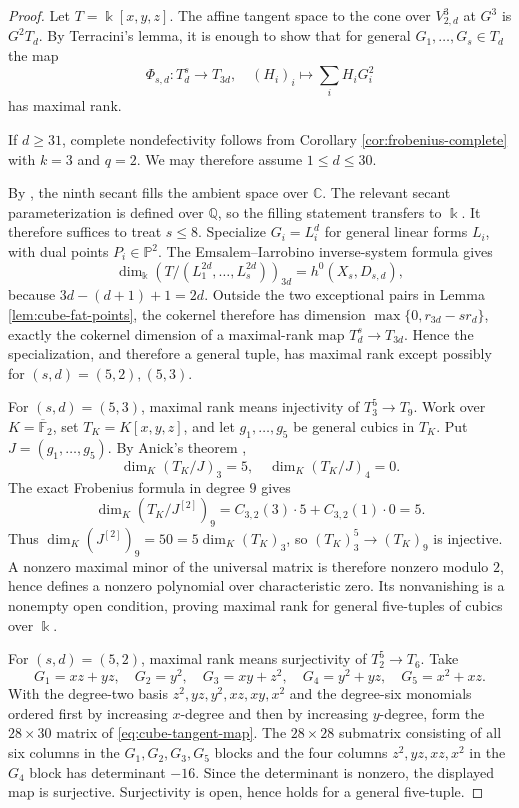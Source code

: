 \documentclass[11pt]{amsart}
\theoremstyle{remark}
\newcommand{\PP}{\mathbb P}
\newcommand{\kk}{\Bbbk}
\begin{document}
\begin{proof}
Let $T=\kk[x,y,z]$. The affine tangent space to the cone over $V^3_{2,d}$ at $G^3$ is $G^2T_d$. By Terracini's lemma, it is enough to show that for general $G_1,\ldots,G_s\in T_d$ the map
\begin{equation}\label{eq:cube-tangent-map}
\Phi_{s,d}:T_d^s\longrightarrow T_{3d},
\quad
(H_i)_i\longmapsto\sum_iH_iG_i^2
\end{equation}
has maximal rank.

If $d\ge31$, complete nondefectivity follows from Corollary \ref{cor:frobenius-complete} with $k=3$ and $q=2$. We may therefore assume $1\le d\le30$.

By \cite[Theorem~4]{FOS}, the ninth secant fills the ambient space over $\mathbb C$. The relevant secant parameterization is defined over $\mathbb Q$, so the filling statement transfers to $\kk$. It therefore suffices to treat $s\le8$. Specialize $G_i=L_i^d$ for general linear forms $L_i$, with dual points $P_i\in\PP^2$. The Emsalem--Iarrobino inverse-system formula \cite[Theorem~I]{EI} gives
$$
\dim_{\kk}\left(T/(L_1^{2d},\ldots,L_s^{2d})\right)_{3d}
=
h^0(X_s,D_{s,d}),
$$
because $3d-(d+1)+1=2d$. Outside the two exceptional pairs in Lemma \ref{lem:cube-fat-points}, the cokernel therefore has dimension $\max\{0,r_{3d}-sr_d\}$, exactly the cokernel dimension of a maximal-rank map $T_d^s\to T_{3d}$. Hence the specialization, and therefore a general tuple, has maximal rank except possibly for $(s,d)=(5,2),(5,3)$.

For $(s,d)=(5,3)$, maximal rank means injectivity of $T_3^5\to T_9$. Work over $K=\overline{\mathbb F}_2$, set $T_K=K[x,y,z]$, and let $g_1,\ldots,g_5$ be general cubics in $T_K$. Put $J=(g_1,\ldots,g_5)$. By Anick's theorem \cite{Anick},
$$
\dim_K(T_K/J)_3=5,
\quad
\dim_K(T_K/J)_4=0.
$$
The exact Frobenius formula in degree $9$ gives
$$
\dim_K(T_K/J^{[2]})_9
=
C_{3,2}(3)\cdot5+C_{3,2}(1)\cdot0
=5.
$$
Thus $\dim_K(J^{[2]})_9=50=5\dim_K(T_K)_3$, so $(T_K)_3^5\to (T_K)_9$ is injective. A nonzero maximal minor of the universal matrix is therefore nonzero modulo $2$, hence defines a nonzero polynomial over characteristic zero. Its nonvanishing is a nonempty open condition, proving maximal rank for general five-tuples of cubics over $\kk$.

For $(s,d)=(5,2)$, maximal rank means surjectivity of $T_2^5\to T_6$. Take
$$
G_1=xz+yz,
\quad G_2=y^2,
\quad G_3=xy+z^2,
\quad G_4=y^2+yz,
\quad G_5=x^2+xz.
$$
With the degree-two basis $z^2,yz,y^2,xz,xy,x^2$ and the degree-six monomials ordered first by increasing $x$-degree and then by increasing $y$-degree, form the $28\times30$ matrix of \eqref{eq:cube-tangent-map}. The $28\times28$ submatrix consisting of all six columns in the $G_1,G_2,G_3,G_5$ blocks and the four columns $z^2,yz,xz,x^2$ in the $G_4$ block has determinant $-16$. Since the determinant is nonzero, the displayed map is surjective. Surjectivity is open, hence holds for a general five-tuple.


\end{proof}
\end{document}
